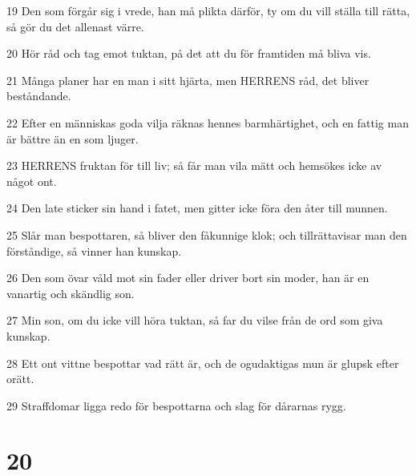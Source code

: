 \par 19 Den som förgår sig i vrede, han må plikta därför, ty om du vill ställa till rätta, så gör du det allenast värre.
\par 20 Hör råd och tag emot tuktan, på det att du för framtiden må bliva vis.
\par 21 Många planer har en man i sitt hjärta, men HERRENS råd, det bliver beståndande.
\par 22 Efter en människas goda vilja räknas hennes barmhärtighet, och en fattig man är bättre än en som ljuger.
\par 23 HERRENS fruktan för till liv; så får man vila mätt och hemsökes icke av något ont.
\par 24 Den late sticker sin hand i fatet, men gitter icke föra den åter till munnen.
\par 25 Slår man bespottaren, så bliver den fåkunnige klok; och tillrättavisar man den förståndige, så vinner han kunskap.
\par 26 Den som övar våld mot sin fader eller driver bort sin moder, han är en vanartig och skändlig son.
\par 27 Min son, om du icke vill höra tuktan, så far du vilse från de ord som giva kunskap.
\par 28 Ett ont vittne bespottar vad rätt är, och de ogudaktigas mun är glupsk efter orätt.
\par 29 Straffdomar ligga redo för bespottarna och slag för dårarnas rygg.

\chapter{20}

